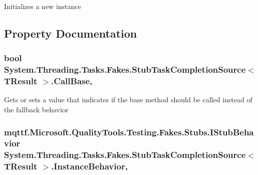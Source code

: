 Initializes a new instance



\subsection{Property Documentation}
\hypertarget{class_system_1_1_threading_1_1_tasks_1_1_fakes_1_1_stub_task_completion_source_3_01_t_result_01_4_a74bafdb6e966b6c72587eb8f2824827f}{
\subsubsection[{Call\-Base}]{\setlength{\rightskip}{0pt plus 5cm}bool System.\-Threading.\-Tasks.\-Fakes.\-Stub\-Task\-Completion\-Source$<$ T\-Result $>$.Call\-Base\hspace{0.3cm}{\ttfamily [get]}, {\ttfamily [set]}}}\label{class_system_1_1_threading_1_1_tasks_1_1_fakes_1_1_stub_task_completion_source_3_01_t_result_01_4_a74bafdb6e966b6c72587eb8f2824827f}


Gets or sets a value that indicates if the base method should be called instead of the fallback behavior

\hypertarget{class_system_1_1_threading_1_1_tasks_1_1_fakes_1_1_stub_task_completion_source_3_01_t_result_01_4_adf60291598e754e51cb28dae099b1fbb}{
\subsubsection[{Instance\-Behavior}]{\setlength{\rightskip}{0pt plus 5cm}mqttf.\-Microsoft.\-Quality\-Tools.\-Testing.\-Fakes.\-Stubs.\-I\-Stub\-Behavior System.\-Threading.\-Tasks.\-Fakes.\-Stub\-Task\-Completion\-Source$<$ T\-Result $>$.Instance\-Behavior\hspace{0.3cm}{\ttfamily [get]}, {\ttfamily [set]}}}\label{class_system_1_1_threading_1_1_tasks_1_1_fakes_1_1_stub_task_completion_source_3_01_t_result_01_4_adf60291598e754e51cb28dae099b1fbb}


